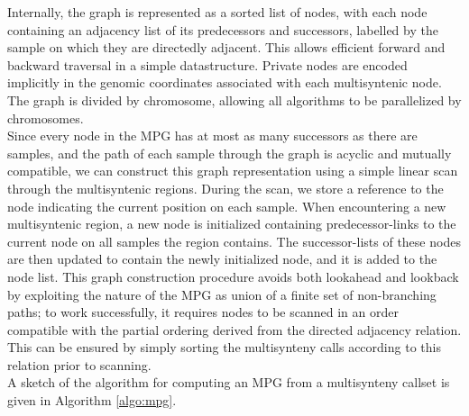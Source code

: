 Internally, the graph is represented as a sorted list of nodes, with each node containing an adjacency list of its predecessors and successors, labelled by the sample on which they are directedly adjacent.
This allows efficient forward and backward traversal in a simple datastructure. %
Private nodes are encoded implicitly in the genomic coordinates associated with each multisyntenic node.
The graph is divided by chromosome, allowing all algorithms to be parallelized by chromosomes.\\
Since every node in the MPG has at most as many successors as there are samples, and the path of each sample through the graph is acyclic and mutually compatible, we can construct this graph representation using a simple linear scan through the multisyntenic regions.
During the scan, we store a reference to the node indicating the current position on each sample.
When encountering a new multisyntenic region, a new node is initialized containing predecessor-links to the current node on all samples the region contains.
The successor-lists of these nodes are then updated to contain the newly initialized node, and it is added to the node list.
This graph construction procedure avoids both lookahead and lookback by exploiting the nature of the MPG as union of a finite set of non-branching paths; to work successfully, it requires nodes to be scanned in an order compatible with the partial ordering derived from the directed adjacency relation.
This can be ensured by simply sorting the multisynteny calls according to this relation prior to scanning.\\
A sketch of the algorithm for computing an MPG from a multisynteny callset is given in Algorithm \ref{algo:mpg}.

